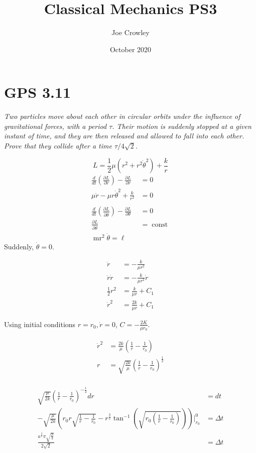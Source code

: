 \documentclass{article}
\title{Classical Mechanics  PS3}
\author{Joe Crowley}
\date{October 2020}
\begin{document}
  

\section{GPS 3.11}
\textit{Two particles move about each other in circular orbits under the influence of gravitational forces, with a period $\tau$. Their motion is suddenly stopped at a given instant of time, and they are then released and allowed to fall into each other. Prove that they collide after a time $\tau / 4 \sqrt{2}$.}


\begin{equation*}
    L=\frac{1}{2} \mu\left(r^{2}+r^{2} \dot{\theta}^{2}\right)+\frac{k}{r}
\end{equation*}
\begin{align*}
    \frac{d}{d t}\left(\frac{\partial L}{\partial \dot{r}}\right)-\frac{\partial L}{\partial r}&=0\\
    \mu \ddot{r}-\mu r \dot{\theta}^{2}+\frac{k}{r^{2}}&=0\\
    &\\
    \frac{d}{d t}\left(\frac{\partial L}{\partial \dot{\theta}}\right)-\frac{\partial L}{\partial \theta}&=0\\
    \frac{\partial L}{\partial \dot{\theta}}&=\operatorname{const}\\
    \operatorname{mr}^{2} \dot{\theta}=\ell
\end{align*}
Suddenly, $\dot{\theta}=0$. 

\begin{align*}
    \ddot{r}&=-\frac{k}{\mu r^{2}}\\
    \ddot{r} \dot{r}&=-\frac{k}{\mu r^{2}} \dot{r}\\
    \frac{1}{2} r^{2}&=\frac{k}{\mu r}+C_{1}\\
    \dot{r}^{2}&=\frac{2 k}{\mu r}+C_1
\end{align*}

Using initial conditions $r = r_0, \dot r = 0$, $C=-\frac{2 K}{\mu r_{0}}$.

\begin{align*}
    \dot{r}^{2}&=\frac{2 k}{\mu}\left(\frac{1}{r}-\frac{1}{r_{0}}\right)\\
    r&=\sqrt{\frac{2 k}{\mu}}\left(\frac{1}{r}-\frac{1}{r_{0}}\right)^{\frac{1}{2}}\\
\end{align*}

\begin{align*}
    \sqrt{\frac{\mu}{2 k}}\left(\frac{1}{r}-\frac{1}{r_{0}}\right)^{-\frac{1}{2}} d r&=dt\\
    -\sqrt{\frac{\mu}{2 k}}\left(r_{0} r \sqrt{\frac{1}{r}-\frac{1}{r_{0}}}-r^{\frac{3}{2}} \tan ^{-1}\left(\sqrt{r_0\left(\frac{1}{r}-\frac{1}{r_{0}}\right)}\right)\right)\Big|_{r_{0}} ^{0}&=\Delta t\\
    \frac{a^{\frac{3}{2}} \pi \sqrt{\frac{\mu}{k}}}{2 \sqrt{2}}&=\Delta t
\end{align*}
\end{document}
